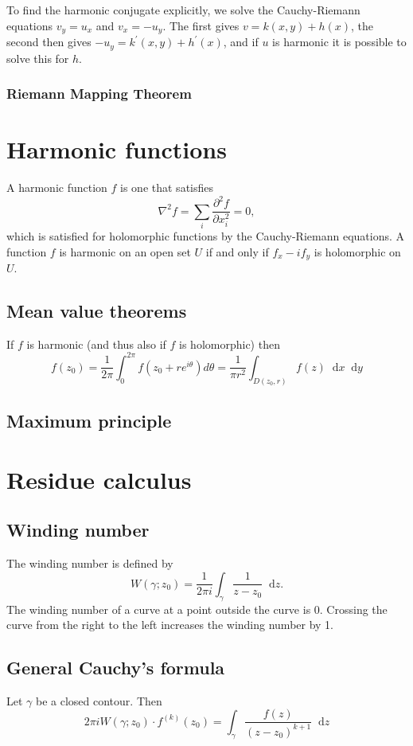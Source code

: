 \documentclass{article}
\newcommand\dif{\mathop{}\!\mathrm{d}}
\begin{document}
To find the harmonic conjugate explicitly, we solve the
Cauchy-Riemann equations $v_y = u_x$ and $v_x = -u_y$. The first gives
$v = k(x, y) + h(x)$, the second then gives
$-u_y = k^\prime(x, y) + h^\prime(x)$, and if $u$ is harmonic it is
possible to solve this for $h$.

\subsubsection{Riemann Mapping Theorem}



\section{Harmonic functions}
A harmonic function $f$ is one that satisfies
$$
  \nabla^2 f
= \sum_i
    \frac{\partial^2 f}
         {\partial x_i^2}
= 0,
$$
which is satisfied for holomorphic functions by the Cauchy-Riemann
equations. A function $f$ is harmonic on an open set $U$
if and only if $f_x - i f_y$ is holomorphic on $U$.

\subsection{Mean value theorems}
If $f$ is harmonic (and thus also if $f$ is holomorphic) then
$$
  f(z_0)
= \frac{1}{2\pi}
  \int_{0}^{2\pi}
    f(z_0 + re^{i\theta})
    d \theta
= \frac{1}{\pi r^2}
  \int_{D(z_0, r)}
    f(z) \dif x \dif y
$$

\subsection{Maximum principle}



\section{Residue calculus}

\subsection{Winding number}
The winding number is defined by
$$
  W(\gamma; z_0)
= \frac{1}{2 \pi i}
  \int_\gamma
    \frac{1}{z - z_0}
    \dif z.
$$
The winding number of a curve at a point outside the curve is
0. Crossing the curve from the right to the left increases the winding
number by 1.

\subsection{General Cauchy's formula}
Let $\gamma$ be a closed contour. Then
$$
  2 \pi i W(\gamma; z_0) \cdot f^{(k)}(z_0)
= \int_\gamma
    \frac{f(z)}{(z - z_0)^{k+1}}
    \dif z
$$
\end{document}
